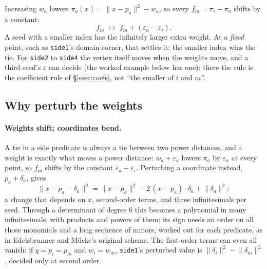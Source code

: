 \documentclass[11pt,a4paper]{article}
\newcommand{\code}[1]{\texttt{#1}}
\newcommand{\norm}[1]{\lVert #1\rVert}
\newcommand{\secref}[1]{\S\ref{#1}}
\theoremstyle{definition}
\theoremstyle{remark}
\begin{document}
Increasing $w_a$ lowers $\pi_a(x) = \norm{x - p_a}^2 - w_a$, so every $f_{ia} = \pi_i - \pi_a$
shifts by a constant:
\[
  f_{ia} \;\longmapsto\; f_{ia} + (\varepsilon_a - \varepsilon_i).
\]
A seed with a smaller index has the infinitely larger extra weight. At a \emph{fixed} point, such
as \code{side1}'s domain corner, that settles it: the smaller index wins the tie. For
\code{side2} to \code{side4} the vertex itself moves when the weights move, and a third seed's
$\varepsilon$ can decide (the worked example below has one); there the rule is the coefficient rule
of \secref{ssec:coefs}, not ``the smaller of $i$ and $m$''.

\subsection{Why perturb the weights}

\paragraph{Weights shift; coordinates bend.} A tie in a side predicate is always a tie between
two power distances, and a weight is exactly what moves a power distance: $w_a + \varepsilon_a$
lowers $\pi_a$ by $\varepsilon_a$ at every point, so $f_{ia}$ shifts by the constant
$\varepsilon_a - \varepsilon_i$. Perturbing a coordinate instead, $p_a + \delta_a$, gives
\[
  \norm{x - p_a - \delta_a}^2 = \norm{x - p_a}^2 - 2\,(x - p_a)\cdot\delta_a + \norm{\delta_a}^2 :
\]
a change that depends on $x$, second-order terms, and three infinitesimals per seed. Through a
determinant of degree 6 this becomes a polynomial in many infinitesimals, with products and
powers of them; its sign needs an order on all those monomials and a long sequence of minors,
worked out for each predicate, as in Edelsbrunner and M\"ucke's original scheme. The first-order
terms can even all vanish: if $q = p_i = p_m$ and $w_i = w_m$, \code{side1}'s perturbed value is
$\norm{\delta_i}^2 - \norm{\delta_m}^2$, decided only at second order.
\end{document}
